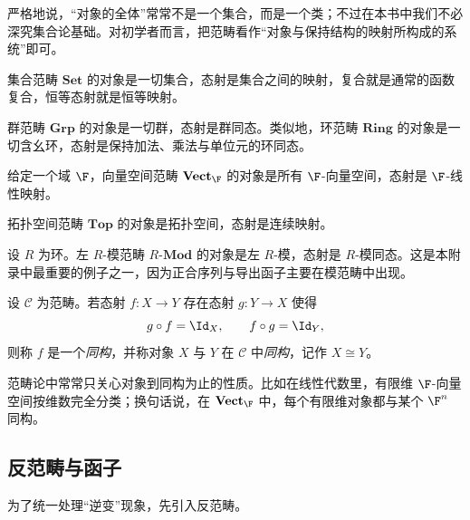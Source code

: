 \begin{remark}
严格地说，“对象的全体”常常不是一个集合，而是一个类；不过在本书中我们不必深究集合论基础。对初学者而言，把范畴看作“对象与保持结构的映射所构成的系统”即可。
\end{remark}

\begin{example}
集合范畴 $\mathbf{Set}$ 的对象是一切集合，态射是集合之间的映射，复合就是通常的函数复合，恒等态射就是恒等映射。
\end{example}

\begin{example}
群范畴 $\mathbf{Grp}$ 的对象是一切群，态射是群同态。类似地，环范畴 $\mathbf{Ring}$ 的对象是一切含幺环，态射是保持加法、乘法与单位元的环同态。
\end{example}

\begin{example}
给定一个域 $\F$，向量空间范畴 $\mathbf{Vect}_{\F}$ 的对象是所有 $\F$-向量空间，态射是 $\F$-线性映射。
\end{example}

\begin{example}
拓扑空间范畴 $\mathbf{Top}$ 的对象是拓扑空间，态射是连续映射。
\end{example}

\begin{example}
设 $R$ 为环。左 $R$-模范畴 $R\text{-}\mathbf{Mod}$ 的对象是左 $R$-模，态射是 $R$-模同态。这是本附录中最重要的例子之一，因为正合序列与导出函子主要在模范畴中出现。
\end{example}

\begin{definition}
设 $\mathcal C$ 为范畴。若态射 $f\colon X\to Y$ 存在态射 $g\colon Y\to X$ 使得
\[
  g\circ f=\Id_X,
  \qquad
  f\circ g=\Id_Y,
\]
则称 $f$ 是一个\emph{同构}，并称对象 $X$ 与 $Y$ 在 $\mathcal C$ 中\emph{同构}，记作 $X\cong Y$。
\end{definition}

\begin{remark}
范畴论中常常只关心对象到同构为止的性质。比如在线性代数里，有限维 $\F$-向量空间按维数完全分类；换句话说，在 $\mathbf{Vect}_{\F}$ 中，每个有限维对象都与某个 $\F^n$ 同构。
\end{remark}

\subsection{反范畴与函子}

为了统一处理“逆变”现象，先引入反范畴。

